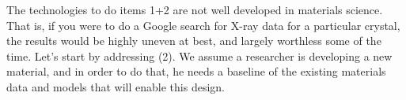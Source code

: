The technologies to do items 1+2 are not well developed in materials science. That is, if you were to do a Google search for X-ray data for a particular crystal, the results would be highly uneven at best, and largely worthless some of the time.  Let’s start by addressing (2).  We assume a researcher is developing a new material, and in order to do that, he needs a baseline of the existing materials data and models that will enable this design.  


